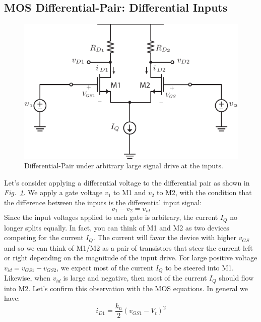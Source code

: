 \subsection{MOS Differential-Pair:  Differential Inputs}
\begin{figure}[tb]
\centering
\includegraphics[scale=1]{Diffamp_large_signal.pdf}
\caption{Differential-Pair under arbitrary large signal drive at the inputs.}
\label{fig:Diff_amp_large.pdf}
\end{figure}
Let's consider applying a differential voltage to the differential pair as shown in \emph{Fig.~\ref{fig:Diff_amp_large.pdf}}.  We apply a gate voltage $v_1$ to M1 and $v_2$ to M2, with the condition that the difference between the inputs is the differential input signal:
    \begin{equation}
        v_1 - v_2 = v_{id}
    \end{equation}
Since the input voltages applied to each gate is arbitrary, the current $I_Q$ no longer splits equally.  In fact, you can think of M1 and M2 as two devices competing for the current $I_Q$.  The current will favor the device with higher $v_{GS}$ and so we can think of M1/M2 as a pair of transistors that steer the current left or right depending on the magnitude of the input drive.  For large positive voltage $v_{id} = v_{GS1} - v_{GS2}$, we expect most of the current $I_Q$ to be steered into M1.  Likewise, when $v_{id}$ is large and negative, then most of the current $I_Q$ should flow into M2.  Let's confirm this observation with the MOS equations.  In general we have:
    \begin{equation}
        {i_{D1}} = \frac{{{k_n}}}{2}{\left( {{v_{GS1}} - {V_t}} \right)^2}
    \end{equation}
